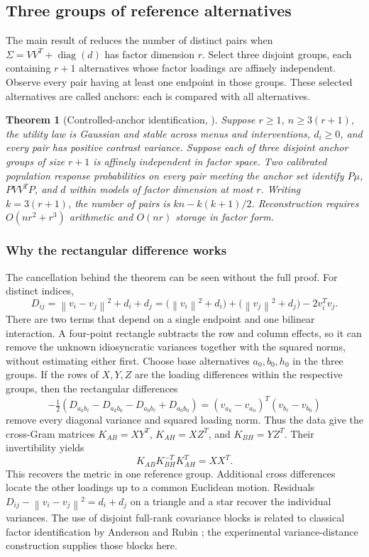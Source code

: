 \documentclass[11pt]{amsart}
\newcommand{\diag}{\operatorname{diag}}
\newcommand{\norm}[1]{\left\lVert#1\right\rVert}
\newtheorem{theorem}{Theorem}[section]
\theoremstyle{definition}
\begin{document}
\subsection{Three groups of reference alternatives}
The main result of \cite{wuebben2026} reduces the number of distinct pairs when
$\Sigma=VV^T+\diag(d)$ has factor dimension $r$. Select three disjoint groups, each containing $r+1$ alternatives whose factor loadings are affinely independent. Observe every pair having at least one endpoint in those groups. These selected alternatives are called anchors: each is compared with all alternatives.

\begin{theorem}[Controlled-anchor identification, \cite{wuebben2026}]\label{thm:imported}
Suppose $r\geq1$, $n\geq3(r+1)$, the utility law is Gaussian and stable across menus and interventions, $d_i\geq0$, and every pair has positive contrast variance. Suppose each of three disjoint anchor groups of size $r+1$ is affinely independent in factor space. Two calibrated population response probabilities on every pair meeting the anchor set identify $P\mu$, $PVV^TP$, and $d$ within models of factor dimension at most $r$. Writing $k=3(r+1)$, the number of pairs is $kn-k(k+1)/2$. Reconstruction requires $O(nr^2+r^3)$ arithmetic and $O(nr)$ storage in factor form.
\end{theorem}

\subsubsection{Why the rectangular difference works}
The cancellation behind the theorem can be seen without the full proof. For distinct indices,
\[
 D_{ij}=\norm{v_i-v_j}^2+d_i+d_j
 =\bigl(\norm{v_i}^2+d_i\bigr)+\bigl(\norm{v_j}^2+d_j\bigr)-2v_i^Tv_j.
\]
There are two terms that depend on a single endpoint and one bilinear
interaction. A four-point rectangle subtracts the row and column effects,
so it can remove the unknown idiosyncratic variances together with the
squared norms, without estimating either first.
Choose base alternatives $a_0,b_0,h_0$ in the three groups. If the rows of $X,Y,Z$ are the loading differences within the respective groups, then the rectangular differences
\[
 -\tfrac12(D_{a_kb_\ell}-D_{a_kb_0}-D_{a_0b_\ell}+D_{a_0b_0})
 = (v_{a_k}-v_{a_0})^T(v_{b_\ell}-v_{b_0})
\]
remove every diagonal variance and squared loading norm. Thus the data give the cross-Gram matrices
$K_{AB}=XY^T$, $K_{AH}=XZ^T$, and $K_{BH}=YZ^T$. Their invertibility yields
\begin{equation}\label{eq:metric}
 K_{AB}K_{BH}^{-T}K_{AH}^T=XX^T.
\end{equation}
This recovers the metric in one reference group. Additional cross differences locate the other loadings up to a common Euclidean motion. Residuals $D_{ij}-\norm{v_i-v_j}^2=d_i+d_j$ on a triangle and a star recover the individual variances. The use of disjoint full-rank covariance blocks is related to classical factor identification by Anderson and Rubin \cite{anderson1956}; the experimental variance-distance construction supplies those blocks here.
\end{document}
